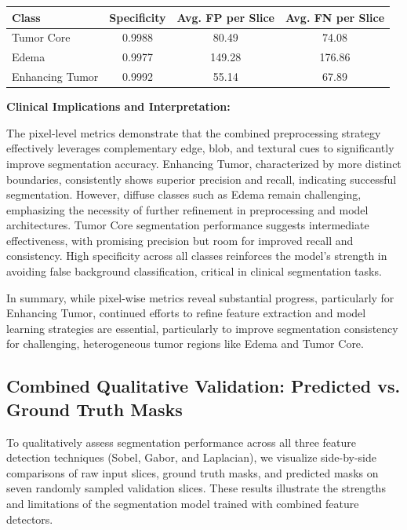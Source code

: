 \begin{center}
\begin{tabular}{lccc}
\toprule
\textbf{Class} & \textbf{Specificity} & \textbf{Avg. FP per Slice} & \textbf{Avg. FN per Slice} \\
\midrule
Tumor Core      & 0.9988 & 80.49  & 74.08 \\
Edema           & 0.9977 & 149.28 & 176.86 \\
Enhancing Tumor & 0.9992 & 55.14  & 67.89 \\
\bottomrule
\end{tabular}
\end{center}

\textbf{Clinical Implications and Interpretation:}

The pixel-level metrics demonstrate that the combined preprocessing strategy effectively leverages complementary edge, blob, and textural cues to significantly improve segmentation accuracy. Enhancing Tumor, characterized by more distinct boundaries, consistently shows superior precision and recall, indicating successful segmentation. However, diffuse classes such as Edema remain challenging, emphasizing the necessity of further refinement in preprocessing and model architectures. Tumor Core segmentation performance suggests intermediate effectiveness, with promising precision but room for improved recall and consistency. High specificity across all classes reinforces the model's strength in avoiding false background classification, critical in clinical segmentation tasks.

In summary, while pixel-wise metrics reveal substantial progress, particularly for Enhancing Tumor, continued efforts to refine feature extraction and model learning strategies are essential, particularly to improve segmentation consistency for challenging, heterogeneous tumor regions like Edema and Tumor Core.

\subsection{Combined Qualitative Validation: Predicted vs. Ground Truth Masks}
\label{sec:combined_qualitative_validation}

To qualitatively assess segmentation performance across all three feature detection techniques (Sobel, Gabor, and Laplacian), we visualize side-by-side comparisons of raw input slices, ground truth masks, and predicted masks on seven randomly sampled validation slices. These results illustrate the strengths and limitations of the segmentation model trained with combined feature detectors.

